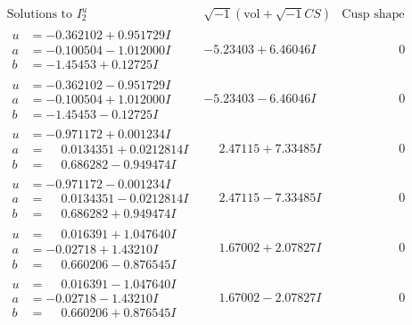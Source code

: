 \documentclass[1p]{elsarticle_modified}
\theoremstyle{definition}
\newcommand{\I}{\sqrt{-1}}
\begin{document}
$$\begin{array}{c|c|c}  
\text{Solutions to }I^u_{2}& \I (\text{vol} + \sqrt{-1}CS) & \text{Cusp shape}\\
 \hline 
\begin{aligned}
u &= -0.362102 + 0.951729 I \\
a &= -0.100504 - 1.012000 I \\
b &= -1.45453 + 0.12725 I\end{aligned}
 & -5.23403 + 6.46046 I & \phantom{-0.000000 } 0 \\ \hline\begin{aligned}
u &= -0.362102 - 0.951729 I \\
a &= -0.100504 + 1.012000 I \\
b &= -1.45453 - 0.12725 I\end{aligned}
 & -5.23403 - 6.46046 I & \phantom{-0.000000 } 0 \\ \hline\begin{aligned}
u &= -0.971172 + 0.001234 I \\
a &= \phantom{-}0.0134351 + 0.0212814 I \\
b &= \phantom{-}0.686282 - 0.949474 I\end{aligned}
 & \phantom{-}2.47115 + 7.33485 I & \phantom{-0.000000 } 0 \\ \hline\begin{aligned}
u &= -0.971172 - 0.001234 I \\
a &= \phantom{-}0.0134351 - 0.0212814 I \\
b &= \phantom{-}0.686282 + 0.949474 I\end{aligned}
 & \phantom{-}2.47115 - 7.33485 I & \phantom{-0.000000 } 0 \\ \hline\begin{aligned}
u &= \phantom{-}0.016391 + 1.047640 I \\
a &= -0.02718 + 1.43210 I \\
b &= \phantom{-}0.660206 - 0.876545 I\end{aligned}
 & \phantom{-}1.67002 + 2.07827 I & \phantom{-0.000000 } 0 \\ \hline\begin{aligned}
u &= \phantom{-}0.016391 - 1.047640 I \\
a &= -0.02718 - 1.43210 I \\
b &= \phantom{-}0.660206 + 0.876545 I\end{aligned}
 & \phantom{-}1.67002 - 2.07827 I & \phantom{-0.000000 } 0 \\ \hline\begin{aligned}

\end{aligned}
\end{array}$$
\end{document}
